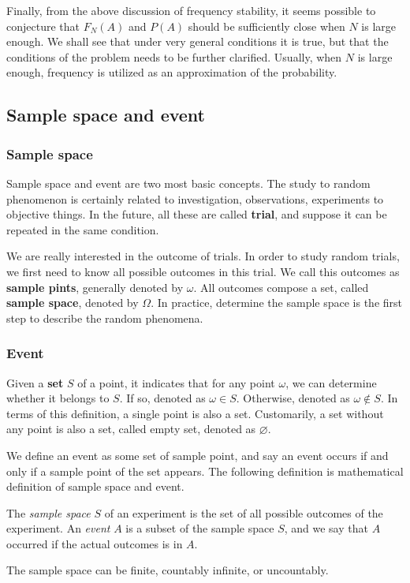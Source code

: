 Finally, from the above discussion of frequency stability, it seems possible to conjecture that $F_N(A)$ and $P(A)$ should be sufficiently close when $N$ is large enough. We shall see that under very general conditions it is true, but that the conditions of the problem needs to be further clarified. Usually, when $N$ is large enough, frequency is utilized as an approximation of the probability.


\subsection{Sample space and event}

\subsubsection{Sample space}

Sample space and event are two most basic concepts. The study to random phenomenon is certainly related to investigation, observations, experiments to objective things. In the future, all these are called \textbf{trial}, and suppose it can be repeated in the same condition.

We are really interested in the outcome of trials. In order to study random trials, we first need to know all possible outcomes in this trial. We call this outcomes as \textbf{sample pints}, generally denoted by $\omega$. All outcomes compose a set, called \textbf{sample space}, denoted by $\Omega$. In practice, determine the sample space is the first step to describe the random phenomena.

\subsubsection{Event}

Given a \textbf{set} $S$ of a point, it indicates that for any point $\omega$, we can determine whether it belongs to $S$. If so, denoted as $\omega \in S$. Otherwise, denoted as $\omega \notin S$. In terms of this definition, a single point is also a set. Customarily, a set without any point is also a set, called empty set, denoted as $\varnothing$.

We define an event as some set of sample point, and say an event occurs if and only if a sample point of the set appears.
The following definition is mathematical definition of sample space and event.
\begin{defn}
    The \textit{sample space} $S$ of an experiment is the set of all possible outcomes of the experiment. An \textit{event} $A$ is a subset of the sample space $S$, and we say that $A$ occurred if the actual outcomes is in $A$.
\end{defn}
The sample space can be finite, countably infinite, or uncountably. 

